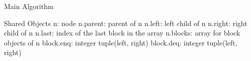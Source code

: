 \documentclass[10pt,table]{article}
\theoremstyle{definition}
\begin{document}
\pagebreak

\begin{algorithm}
\caption{Main Algorithm}\label{alg}
\begin{algorithmic}[1]
\onehalfspacing


\Statex Shared Objects
\Statex \hspace{\algorithmicindent}n: node
\Statex \hspace{\algorithmicindent}\hspace{\algorithmicindent}n.parent: parent of n
\Statex \hspace{\algorithmicindent}\hspace{\algorithmicindent}n.left: left child of n
\Statex \hspace{\algorithmicindent}\hspace{\algorithmicindent}n.right: right child of n
\Statex \hspace{\algorithmicindent}\hspace{\algorithmicindent}n.last: index of the last block in the array
\Statex \hspace{\algorithmicindent}\hspace{\algorithmicindent}n.blocks: array for block objects of n
\Statex \hspace{\algorithmicindent}\hspace{\algorithmicindent}\hspace{\algorithmicindent}block.enq: integer tuple(left, right) 
\Statex \hspace{\algorithmicindent}\hspace{\algorithmicindent}\hspace{\algorithmicindent}block.deq: integer tuple(left, right) 


\end{algorithmic}
\end{algorithm}
\end{document}
